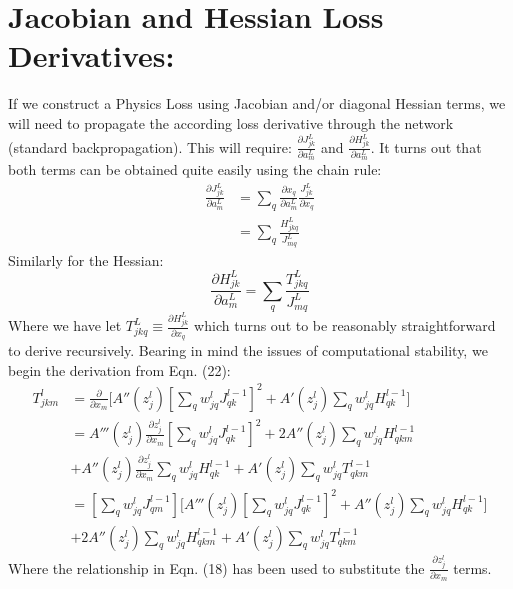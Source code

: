 \documentclass{article}
\begin{document}
\section*{Jacobian and Hessian Loss Derivatives:}
If we construct a Physics Loss using Jacobian and/or diagonal Hessian terms, we will need to propagate the according loss derivative through the network (standard backpropagation). This will require: \(\frac{\partial J_{jk}^L}{\partial a_m^L}\) and \(\frac{\partial H_{jk}^L}{\partial a_m^L}\). It turns out that both terms can be obtained quite easily using the chain rule:
\begin{align}
\frac{\partial J_{jk}^L}{\partial a_m^L} &= \sum_q \frac{\partial x_q}{\partial a_m^L} \frac{J_{jk}^L}{\partial x_q} \\
&= \sum_q \frac{H_{jkq}^L}{J_{mq}^L}
\end{align}
Similarly for the Hessian:
\begin{equation}
\frac{\partial H_{jk}^L}{\partial a_m^L} = \sum_q \frac{T_{jkq}^L}{J_{mq}^L}
\end{equation}
Where we have let \( T_{jkq}^L \equiv \frac{\partial H_{jk}^L}{\partial x_q} \) which turns out to be reasonably straightforward to derive recursively. Bearing in mind the issues of computational stability, we begin the derivation from Eqn. (22):
\begin{align}
T_{jkm}^l &= \frac{\partial}{\partial x_m} \Bigg[ A''(z_j^l) \left[ \sum_q w_{jq}^l J_{qk}^{l-1} \right]^2 + A'(z_j^l) \sum_q w_{jq}^l H_{qk}^{l-1} \Bigg] \\
&= A'''(z_j^l) \frac{\partial z_j^l}{\partial x_m} \left[ \sum_q w_{jq}^l J_{qk}^{l-1} \right]^2 + 2A''(z_j^l) \sum_q w_{jq}^l H_{qkm}^{l-1}  \\
&+ A''(z_j^l) \frac{\partial z_j^l}{\partial x_m} \sum_q w_{jq}^l H_{qk}^{l-1} + A'(z_j^l) \sum_q w_{jq}^l T_{qkm}^{l-1} \\
&= \left[ \sum_q w_{jq}^l J_{qm}^{l-1} \right] \Bigg[ A'''(z_j^l) \left[ \sum_q w_{jq}^l J_{qk}^{l-1} \right]^2 + A''(z_j^l) \sum_q w_{jq}^l H_{qk}^{l-1} \Bigg] \\
&+ 2A''(z_j^l) \sum_q w_{jq}^l H_{qkm}^{l-1} + A'(z_j^l) \sum_q w_{jq}^l T_{qkm}^{l-1}
\end{align}
Where the relationship in Eqn. (18) has been used to substitute the \(\frac{\partial z_j^l}{\partial x_m}\) terms.
\end{document}
